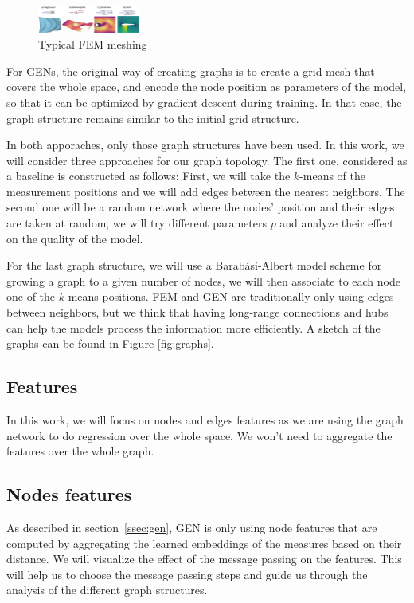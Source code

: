 \documentclass[a4paper,10pt]{article}
\begin{document}
\begin{figure}
  \centering
  \includegraphics[trim={780 0 300 50},clip,width=0.3\textwidth]{figs/mesh-dataset}
  \caption{Typical FEM meshing \cite{pfaff2020learning}}
\end{figure}

For GENs, the original way of creating graphs is to create a grid mesh that covers the whole space, and encode the node position as parameters of the model, so that it can be optimized by gradient descent during training. In that case, the graph structure remains similar to the initial grid structure.

In both apporaches, only those graph structures have been used. In this work, we will consider three approaches for our graph topology. The first one, considered as a baseline is constructed as follows: First, we will take the $k$-means of the measurement positions and we will add edges between the nearest neighbors. The second one will be a random network where the nodes' position and their edges are taken at random, we will try different parameters $p$ and analyze their effect on the quality of the model.

For the last graph structure, we will use a Barab\'asi-Albert model scheme for growing a graph to a given number of nodes, we will then associate to each node one of the $k$-means positions. FEM and GEN are traditionally only using edges between neighbors, but we think that having long-range connections and hubs can help the models process the information more efficiently. A sketch of the graphs can be found in Figure \ref{fig:graphs}.


\subsection{Features}

In this work, we will focus on nodes and edges features as we are using the graph network to do regression over the whole space. We won't need to aggregate the features over the whole graph.


\subsection{Nodes features}
As described in section~\ref{ssec:gen}, GEN is only using node features that are computed by aggregating the learned embeddings of the measures based on their distance. We will visualize the effect of the message passing on the features. This will help us to choose the message passing steps and guide us through the analysis of the different graph structures.
\end{document}
